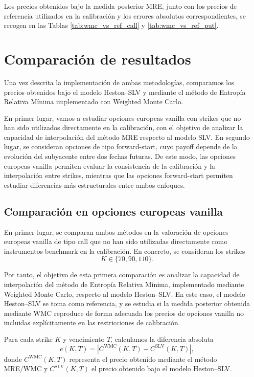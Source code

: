 Los precios obtenidos bajo la medida posterior MRE, junto con los precios de referencia utilizados en la calibración y los errores absolutos correspondientes, se recogen en las Tablas \ref{tab:wmc_vs_ref_call} y \ref{tab:wmc_vs_ref_put}.


\section{Comparación de resultados}

Una vez descrita la implementación de ambas metodologías, comparamos los precios obtenidos bajo el modelo Heston--SLV y mediante el método de Entropía Relativa Mínima implementado con Weighted Monte Carlo.\medskip

 En primer lugar, vamos a estudiar opciones europeas vanilla con strikes que no han sido utilizados directamente en la calibración, con el objetivo de analizar la capacidad de interpolación del método MRE respecto al modelo SLV. En segundo lugar, se consideran opciones de tipo forward-start, cuyo payoff depende de la evolución del subyacente entre dos fechas futuras. De este modo, las opciones europeas vanilla permiten evaluar la consistencia de la calibración y la interpolación entre strikes, mientras que las opciones forward-start permiten estudiar diferencias más estructurales entre ambos enfoques.


\subsection{Comparación en opciones europeas vanilla}

En primer lugar, se comparan ambos métodos en la valoración de opciones europeas
vanilla de tipo call que no han sido utilizadas directamente como instrumentos
benchmark en la calibración. En concreto, se consideran los strikes
\[
K \in \{70,90,110\}.
\]


Por tanto, el objetivo de esta primera comparación es analizar la capacidad de
interpolación del método de Entropía Relativa Mínima, implementado mediante
Weighted Monte Carlo, respecto al modelo Heston--SLV. En este caso, el
modelo Heston--SLV se toma como referencia, y se estudia si la medida posterior
obtenida mediante WMC reproduce de forma adecuada los precios de opciones
vanilla no incluidas explícitamente en las restricciones de calibración.

Para cada strike \(K\) y vencimiento \(T\), calculamos la diferencia absoluta
\[
e(K,T)
=
\left|
C^{\mathrm{WMC}}(K,T)
-
C^{\mathrm{SLV}}(K,T)
\right|,
\]
donde \(C^{\mathrm{WMC}}(K,T)\) representa el precio obtenido mediante el método
MRE/WMC y \(C^{\mathrm{SLV}}(K,T)\) el precio obtenido bajo el modelo Heston--SLV.\medskip

